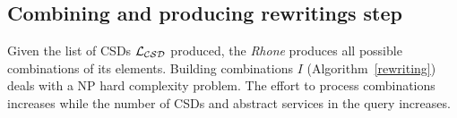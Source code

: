 \subsection{Combining and producing rewritings step}
Given the list of CSDs $\hbox{${\cal L_{CSD}}$}$ produced, the \textit{Rhone} produces all possible combinations of its elements. 
Building combinations $I$ (Algorithm~\ref{rewriting}) deals with a NP hard complexity problem.
The effort to process combinations increases while the number of CSDs and abstract services in the query increases.



